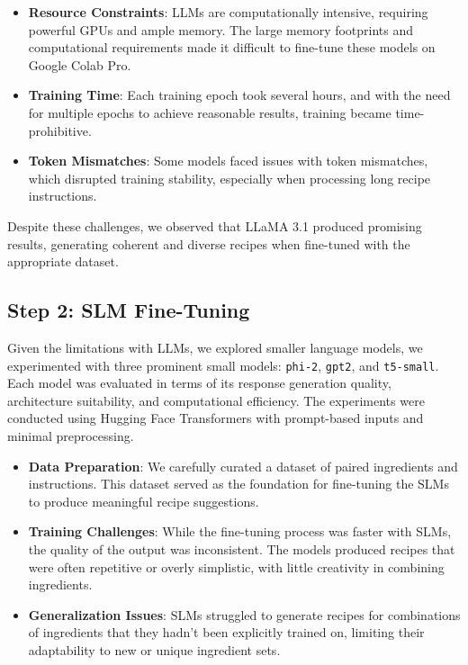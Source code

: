\documentclass[letterpaper,11pt]{report}
\begin{document}
\begin{itemize}
\item \textbf{Resource Constraints}: LLMs are computationally intensive, requiring powerful GPUs and ample memory. The large memory footprints and computational requirements made it difficult to fine-tune these models on Google Colab Pro.
\item \textbf{Training Time}: Each training epoch took several hours, and with the need for multiple epochs to achieve reasonable results, training became time-prohibitive.
\item \textbf{Token Mismatches}: Some models faced issues with token mismatches, which disrupted training stability, especially when processing long recipe instructions.
\end{itemize}

Despite these challenges, we observed that LLaMA 3.1 produced promising results, generating coherent and diverse recipes when fine-tuned with the appropriate dataset.

\subsection{Step 2: SLM Fine-Tuning}

Given the limitations with LLMs, we explored smaller language models, we experimented with three prominent small models: \texttt{phi-2}, \texttt{gpt2}, and \texttt{t5-small}. Each model was evaluated in terms of its response generation quality, architecture suitability, and computational efficiency. The experiments were conducted using Hugging Face Transformers with prompt-based inputs and minimal preprocessing.


\begin{itemize}
\item \textbf{Data Preparation}: We carefully curated a dataset of paired ingredients and instructions. This dataset served as the foundation for fine-tuning the SLMs to produce meaningful recipe suggestions.
\item \textbf{Training Challenges}: While the fine-tuning process was faster with SLMs, the quality of the output was inconsistent. The models produced recipes that were often repetitive or overly simplistic, with little creativity in combining ingredients.
\item \textbf{Generalization Issues}: SLMs struggled to generate recipes for combinations of ingredients that they hadn't been explicitly trained on, limiting their adaptability to new or unique ingredient sets.
\end{itemize}
\end{document}
